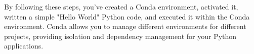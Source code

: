 By following these steps, you've created a Conda environment, activated it, written a simple "Hello World" Python code, and executed it within the Conda environment. Conda allows you to manage different environments for different projects, providing isolation and dependency management for your Python applications.






	

